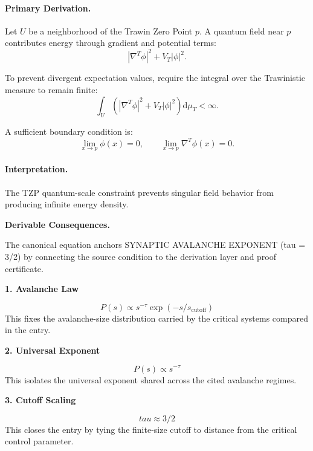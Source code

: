 \paragraph{Primary Derivation.}
Let $U$ be a neighborhood of the Trawin Zero Point $p$.  
A quantum field near $p$ contributes energy through gradient and potential terms:
\begin{equation}
|\nabla^T\phi|^2
+
V_T|\phi|^2 .
\end{equation}

To prevent divergent expectation values, require the integral over the Trawinistic measure to remain finite:
\begin{equation}
\int_U
\left(
|\nabla^T\phi|^2
+
V_T|\phi|^2
\right)
\mathrm{d}\mu_T
<\infty .
\end{equation}

A sufficient boundary condition is:
\begin{equation}
\boxed{
\lim_{x\to p}\phi(x)=0,
\qquad
\lim_{x\to p}\nabla^T\phi(x)=0 .
}
\end{equation}

\paragraph{Interpretation.}
The TZP quantum-scale constraint prevents singular field behavior from producing infinite energy density.

\par\vspace{0.35em}
\noindent\textbf{Derivable Consequences.}\quad
\begingroup
\footnotesize
\raggedright
The canonical equation anchors SYNAPTIC AVALANCHE EXPONENT (tau = 3/2) by connecting the source condition to the derivation layer and proof certificate.
\par\endgroup

\noindent\textbf{1. Avalanche Law}\par
\[
P(s) \propto s^{-\tau} \exp(-s/s_{\text{cutoff}})
\]
\noindent This fixes the avalanche-size distribution carried by the critical systems compared in the entry.\par
\noindent\textbf{2. Universal Exponent}\par
\[
P(s) \propto s^{-\tau}
\]
\noindent This isolates the universal exponent shared across the cited avalanche regimes.\par
\noindent\textbf{3. Cutoff Scaling}\par
\[
tau \approx 3/2
\]
\noindent This closes the entry by tying the finite-size cutoff to distance from the critical control parameter.\par

